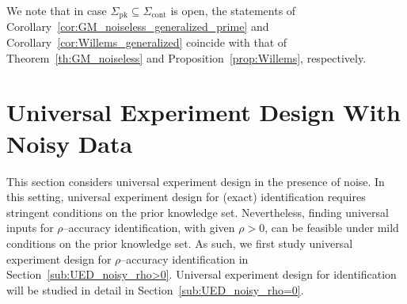 \documentclass[journal,twoside,web]{ieeecolor}
\newcommand{\set}[2]{\left\{#1 \mid #2\right\}}
\newtheorem{example}[theorem]{Example}
\begin{document}

We note that in case $\Sigma_\text{pk}\subseteq\Sigma_\text{cont}$ is open, the statements of Corollary~\ref{cor:GM_noiseless_generalized_prime} and Corollary~\ref{cor:Willems_generalized} coincide with that of Theorem~\ref{th:GM_noiseless} and Proposition~\ref{prop:Willems}, respectively. 

\section{Universal Experiment Design
With Noisy Data}
\label{sec:i-o gain}

This section considers universal experiment design in the presence of noise. In this setting, universal experiment design for  (exact) identification requires stringent conditions on the prior knowledge set. Nevertheless, finding universal inputs for $\rho$--accuracy identification, with given \mbox{$\rho>0$}, can be feasible under mild conditions on the prior knowledge set. As such, we first study universal experiment design for $\rho$--accuracy identification in Section~\ref{sub:UED_noisy_rho>0}. Universal experiment design for identification will be studied in detail in Section~\ref{sub:UED_noisy_rho=0}.  
\end{document}
